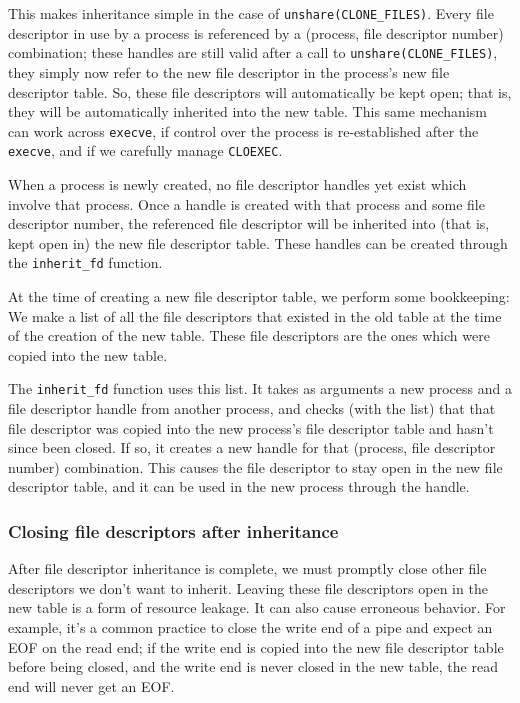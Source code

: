 \documentclass[sigplan]{acmart}
\begin{document}
This makes inheritance simple in the case of \verb|unshare(CLONE_FILES)|.
Every file descriptor in use by a process
is referenced by a (process, file descriptor number) combination;
these handles are still valid after a call to \verb|unshare(CLONE_FILES)|,
they simply now refer to the new file descriptor in the process's new file descriptor table.
So, these file descriptors will automatically be kept open;
that is, they will be automatically inherited into the new table.
This same mechanism can work across \texttt{execve},
if control over the process is re-established after the \texttt{execve},
and if we carefully manage \texttt{CLOEXEC}.

When a process is newly created,
no file descriptor handles yet exist which involve that process.
Once a handle is created with that process and some file descriptor number,
the referenced file descriptor will be inherited into (that is, kept open in) the new file descriptor table.
These handles can be created through the \verb|inherit_fd| function.

At the time of creating a new file descriptor table,
we perform some bookkeeping:
We make a list of all the file descriptors that existed in the old table
at the time of the creation of the new table.
These file descriptors are the ones which were copied into the new table.

The \verb|inherit_fd| function uses this list.
It takes as arguments a new process and a file descriptor handle from another process,
and checks (with the list) that that file descriptor was copied into the new process's file descriptor table
and hasn't since been closed.
If so, it creates a new handle for that (process, file descriptor number) combination.
This causes the file descriptor to stay open in the new file descriptor table,
and it can be used in the new process through the handle.
\subsubsection{Closing file descriptors after inheritance}
After file descriptor inheritance is complete,
we must promptly close other file descriptors we don't want to inherit.
Leaving these file descriptors open in the new table is a form of resource leakage.
It can also cause erroneous behavior.
For example, it's a common practice to close the write end of a pipe
and expect an EOF on the read end;
if the write end is copied into the new file descriptor table before being closed,
and the write end is never closed in the new table,
the read end will never get an EOF.
\end{document}
